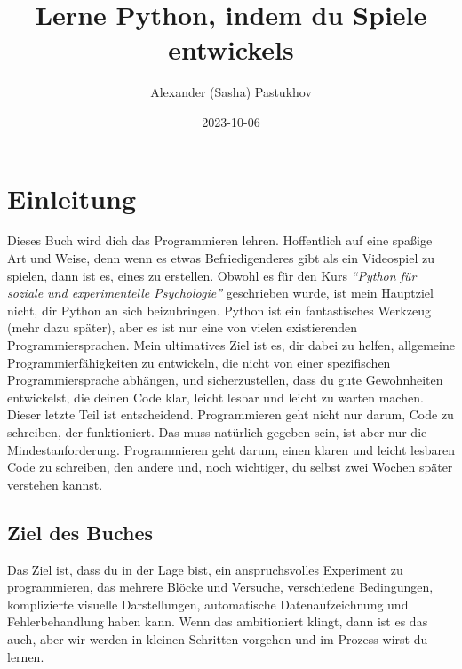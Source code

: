 \documentclass[
]{book}
\title{Lerne Python, indem du Spiele entwickels}
\author{Alexander (Sasha) Pastukhov}
\date{2023-10-06}
\begin{document}
\maketitle

{
\setcounter{tocdepth}{1}
\tableofcontents
}
\hypertarget{intro}{%
\chapter{Einleitung}\label{intro}}

Dieses Buch wird dich das Programmieren lehren. Hoffentlich auf eine spaßige Art und Weise, denn wenn es etwas Befriedigenderes gibt als ein Videospiel zu spielen, dann ist es, eines zu erstellen. Obwohl es für den Kurs \emph{``Python für soziale und experimentelle Psychologie''} geschrieben wurde, ist mein Hauptziel nicht, dir Python an sich beizubringen. Python ist ein fantastisches Werkzeug (mehr dazu später), aber es ist nur eine von vielen existierenden Programmiersprachen. Mein ultimatives Ziel ist es, dir dabei zu helfen, allgemeine Programmierfähigkeiten zu entwickeln, die nicht von einer spezifischen Programmiersprache abhängen, und sicherzustellen, dass du gute Gewohnheiten entwickelst, die deinen Code klar, leicht lesbar und leicht zu warten machen. Dieser letzte Teil ist entscheidend. Programmieren geht nicht nur darum, Code zu schreiben, der funktioniert. Das muss natürlich gegeben sein, ist aber nur die Mindestanforderung. Programmieren geht darum, einen klaren und leicht lesbaren Code zu schreiben, den andere und, noch wichtiger, du selbst zwei Wochen später verstehen kannst.

\hypertarget{ziel-des-buches}{%
\section{Ziel des Buches}\label{ziel-des-buches}}

Das Ziel ist, dass du in der Lage bist, ein anspruchsvolles Experiment zu programmieren, das mehrere Blöcke und Versuche, verschiedene Bedingungen, komplizierte visuelle Darstellungen, automatische Datenaufzeichnung und Fehlerbehandlung haben kann. Wenn das ambitioniert klingt, dann ist es das auch, aber wir werden in kleinen Schritten vorgehen und im Prozess wirst du lernen.
\end{document}
